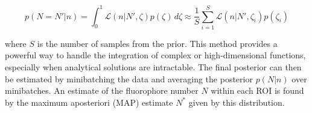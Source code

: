 \begin{equation}
p(N=N'\lvert n) = \int_{0}^{1} \mathcal{L}(n\lvert N',\zeta) p(\zeta) \, d\zeta \approx \frac{1}{S} \sum_{i=1}^S \mathcal{L}(n\lvert N',\zeta_i) p(\zeta_i)
\end{equation}

where $S$ is the number of samples from the prior. This method provides a powerful way to handle the integration of complex or high-dimensional functions, especially when analytical solutions are intractable. The final posterior can then be estimated by minibatching the data and averaging the posterior $p(N\lvert n)$ over minibatches. An estimate of the fluorophore number $N$ within each ROI is found by the maximum aposteriori (MAP) estimate $N^{*}$ given by this distribution.






